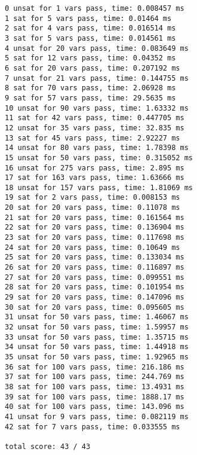 \documentclass[11pt,a4paper]{ctexart}
\begin{document}
\begin{lstlisting}
0 unsat for 1 vars pass, time: 0.008457 ms
1 sat for 5 vars pass, time: 0.01464 ms
2 sat for 4 vars pass, time: 0.016514 ms
3 sat for 5 vars pass, time: 0.014561 ms
4 unsat for 20 vars pass, time: 0.083649 ms
5 sat for 12 vars pass, time: 0.04352 ms
6 sat for 20 vars pass, time: 0.207192 ms
7 unsat for 21 vars pass, time: 0.144755 ms
8 sat for 70 vars pass, time: 2.06928 ms
9 sat for 57 vars pass, time: 29.5635 ms
10 unsat for 90 vars pass, time: 1.63332 ms
11 sat for 42 vars pass, time: 0.447705 ms
12 unsat for 35 vars pass, time: 32.835 ms
13 sat for 45 vars pass, time: 2.92227 ms
14 unsat for 80 vars pass, time: 1.78398 ms
15 unsat for 50 vars pass, time: 0.315052 ms
16 unsat for 275 vars pass, time: 2.895 ms
17 sat for 163 vars pass, time: 1.63666 ms
18 unsat for 157 vars pass, time: 1.81069 ms
19 sat for 2 vars pass, time: 0.008153 ms
20 sat for 20 vars pass, time: 0.11078 ms
21 sat for 20 vars pass, time: 0.161564 ms
22 sat for 20 vars pass, time: 0.136904 ms
23 sat for 20 vars pass, time: 0.117698 ms
24 sat for 20 vars pass, time: 0.10649 ms
25 sat for 20 vars pass, time: 0.133034 ms
26 sat for 20 vars pass, time: 0.116897 ms
27 sat for 20 vars pass, time: 0.099551 ms
28 sat for 20 vars pass, time: 0.101954 ms
29 sat for 20 vars pass, time: 0.147096 ms
30 sat for 20 vars pass, time: 0.095605 ms
31 unsat for 50 vars pass, time: 1.46067 ms
32 unsat for 50 vars pass, time: 1.59957 ms
33 unsat for 50 vars pass, time: 1.35715 ms
34 unsat for 50 vars pass, time: 1.44918 ms
35 unsat for 50 vars pass, time: 1.92965 ms
36 sat for 100 vars pass, time: 216.186 ms
37 sat for 100 vars pass, time: 244.769 ms
38 sat for 100 vars pass, time: 13.4931 ms
39 sat for 100 vars pass, time: 1888.17 ms
40 sat for 100 vars pass, time: 143.096 ms
41 unsat for 9 vars pass, time: 0.082119 ms
42 sat for 7 vars pass, time: 0.033555 ms

total score: 43 / 43
\end{lstlisting}

\printbibliography
\end{document}
